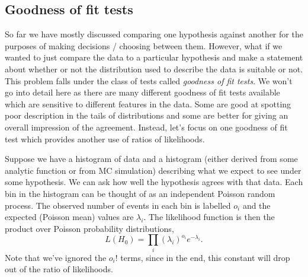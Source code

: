 \subsection{Goodness of fit tests}
So far we have mostly discussed comparing one hypothesis against another for the purposes of making decisions / choosing between them. However, what if we wanted to just compare the data to a particular hypothesis and make a statement about whether or not the distribution used to describe the data is suitable or not. This problem falls under the class of tests called \emph{goodness of fit tests}. We won't go into detail here as there are many different goodness of fit tests available which are sensitive to different features in the data. Some are good at spotting poor description in the tails of distributions and some are better for giving an overall impression of the agreement. Instead, let's focus on one goodness of fit test which provides another use of ratios of likelihoods. 

Suppose we have a histogram of data and a histogram (either derived from some analytic function or from MC simulation) describing what we expect to see under some hypothesis. We can ask how well the hypothesis agrees with that data. Each bin in the histogram can be thought of as an independent Poisson random process. The observed number of events in each bin is labelled $o_{i}$ and the expected (Poisson mean) values are $\lambda_{i}$. The likelihood function is then the product over Poisson probability distributions, 
\begin{equation}
    L(H_0) = \prod_{i} (\lambda_{i})^{o_{i}}e^{-\lambda_{i}}.
\end{equation}
Note that we've ignored the $o_{i}!$ terms, since in the end, this constant will drop out of the ratio of likelihoods. 

